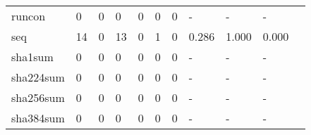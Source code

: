 \begin{longtable}{lp{1.2cm}p{1.2cm}p{1.2cm}p{1.2cm}p{1.2cm}p{1.2cm}p{1.2cm}p{1.2cm}p{1.2cm}p{1.2cm}}
runcon    &                                     0 &                                                  0 &                                                0 &                                               0 &                                                0 &                                              0 &                                                  - &                                                  - &                                                  - \\
seq       &                                    14 &                                                  0 &                                               13 &                                               0 &                                                1 &                                              0 &                                              0.286 &                                              1.000 &                                              0.000 \\
sha1sum   &                                     0 &                                                  0 &                                                0 &                                               0 &                                                0 &                                              0 &                                                  - &                                                  - &                                                  - \\
sha224sum &                                     0 &                                                  0 &                                                0 &                                               0 &                                                0 &                                              0 &                                                  - &                                                  - &                                                  - \\
sha256sum &                                     0 &                                                  0 &                                                0 &                                               0 &                                                0 &                                              0 &                                                  - &                                                  - &                                                  - \\
sha384sum &                                     0 &                                                  0 &                                                0 &                                               0 &                                                0 &                                              0 &                                                  - &                                                  - &                                                  - \\

\end{longtable}
